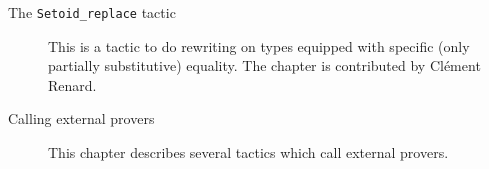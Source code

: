 \begin{description}
\item[The {\tt Setoid\_replace} tactic] This is a
  tactic to do rewriting on types equipped with specific (only partially
  substitutive) equality. The chapter is contributed by Clément Renard.

\item[Calling external provers] This chapter describes several tactics
  which call external provers.

\end{description}

\atableofcontents


